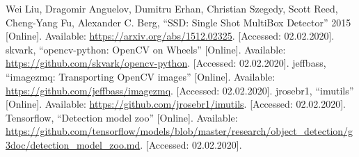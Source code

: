 \begin{flushleft}
\begin{thebibliography}{99}
 Wei Liu, Dragomir Anguelov, Dumitru Erhan, Christian Szegedy, Scott Reed, Cheng-Yang Fu, Alexander C. Berg, ``SSD: Single Shot MultiBox Detector'' 2015 [Online]. Available: \url{https://arxiv.org/abs/1512.02325}. [Accessed: 02.02.2020].
 skvark, ``opencv-python: OpenCV on Wheels'' [Online]. Available: \url{https://github.com/skvark/opencv-python}. [Accessed: 02.02.2020].
 jeffbass, ``imagezmq: Transporting OpenCV images'' [Online]. Available: \url{https://github.com/jeffbass/imagezmq}. [Accessed: 02.02.2020].
 jrosebr1, ``imutils'' [Online]. Available: \url{https://github.com/jrosebr1/imutils}. [Accessed: 02.02.2020].
 Tensorflow, ``Detection model zoo'' [Online]. Available: \url{https://github.com/tensorflow/models/blob/master/research/object_detection/g3doc/detection_model_zoo.md}. [Accessed: 02.02.2020].
\end{thebibliography} 

\end{flushleft}

